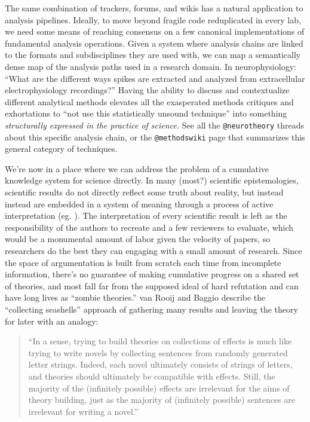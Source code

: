 \documentclass[10pt]{article}
\begin{document}
\begin{multicols}{2}
The same combination of trackers, forums, and wikis has a natural
application to analysis pipelines. Ideally, to move beyond fragile code
reduplicated in every lab, we need some means of reaching consensus on a
few canonical implementations of fundamental analysis operations. Given
a system where analysis chains are linked to the formats and
subdisciplines they are used with, we can map a semantically dense map
of the analysis paths used in a research domain. In neurophysiology:
``What are the different ways spikes are extracted and analyzed from
extracellular electrophysiology recordings?'' Having the ability to
discuss and contextualize different analytical methods elevates all the
exasperated methods critiques and exhortations to ``not use this
statistically unsound technique'' into something \emph{structurally
expressed in the practice of science.} See all the \texttt{@neurotheory}
threads about this specific analysis chain, or the \texttt{@methodswiki}
page that summarizes this general category of techniques.

We're now in a place where we can address the problem of a cumulative
knowledge system for science directly. In many (most?) scientific
epistemologies, scientific results do not directly reflect some truth
about reality, but instead instead are embedded in a system of meaning
through a process of active interpretation (eg. \cite{meehlTheoreticalRisksTabular1978} ). The interpretation of every
scientific result is left as the responsibility of the authors to
recreate and a few reviewers to evaluate, which would be a monumental
amount of labor given the velocity of papers, so researchers do the best
they can engaging with a small amount of research. Since the space of
argumentation is built from scratch each time from incomplete
information, there's no guarantee of making cumulative progress on a
shared set of theories, and most fall far from the supposed ideal of
hard refutation and can have long lives as ``zombie theories.'' van
Rooij and Baggio describe the ``collecting seashells'' approach of
gathering many results and leaving the theory for later with an analogy:

\begin{quote}
``In a sense, trying to build theories on collections of effects is much
like trying to write novels by collecting sentences from randomly
generated letter strings. Indeed, each novel ultimately consists of
strings of letters, and theories should ultimately be compatible with
effects. Still, the majority of the (infinitely possible) effects are
irrelevant for the aims of theory building, just as the majority of
(infinitely possible) sentences are irrelevant for writing a novel.''
\cite{vanrooijTheoryTestHow2021} 
\end{quote}


\end{multicols}
\end{document}
